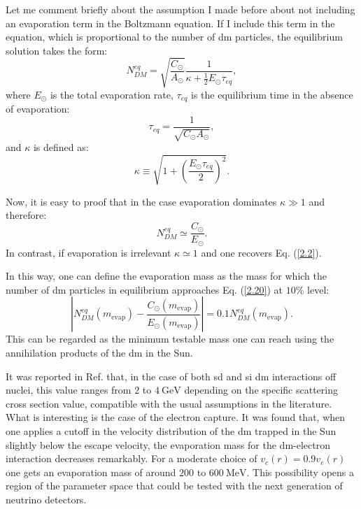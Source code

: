 Let me comment briefly about the assumption I made before about not including an evaporation term in the Boltzmann equation. If I include this term in the equation, which is proportional to the number of \gls{dm} particles, the equilibrium solution takes the form:
\begin{equation}\label{2.17}
	N_{DM}^{eq} = \sqrt{\frac{C_{\odot}}{A_{\odot}}} \frac{1}{\kappa + \frac{1}{2} E_{\odot} \tau_{eq}},
\end{equation}
where $E_{\odot}$ is the total evaporation rate, $\tau_{eq}$ is the equilibrium time in the absence of evaporation:
\begin{equation}\label{2.18}
	\tau_{eq} = \frac{1}{\sqrt{C_{\odot} A_{\odot}}},
\end{equation}
and $\kappa$ is defined as:
\begin{equation}\label{2.19}
	\kappa \equiv \sqrt{1+\left(\frac{E_{\odot}\tau_{eq}}{2}\right)^{2}}.
\end{equation}

Now, it is easy to proof that in the case evaporation dominates $\kappa \gg 1$ and therefore:
\begin{equation}\label{2.20}
	N_{DM}^{eq} \simeq \frac{C_{\odot}}{E_{\odot}}.
\end{equation}
In contrast, if evaporation is irrelevant $\kappa \simeq 1$ and one recovers Eq. (\ref{2.2}).

In this way, one can define the evaporation mass as the mass for which the number of \gls{dm} particles in equilibrium approaches Eq. (\ref{2.20}) at $10 \%$ level:
\begin{equation}\label{2.21}
	\left| N_{DM}^{eq}(m_{\mathrm{evap}}) - \frac{C_{\odot}(m_{\mathrm{evap}})}{E_{\odot}(m_{\mathrm{evap}})} \right| = 0.1 N_{DM}^{eq}(m_{\mathrm{evap}}).
\end{equation}
This can be regarded as the minimum testable mass one can reach using the annihilation products of the \gls{dm} in the Sun.

It was reported in Ref. \cite{Palomares2017} that, in the case of both \gls{sd} and \gls{si} \gls{dm} interactions off nuclei, this value ranges from $2$ to $4 \ \mathrm{GeV}$ depending on the specific scattering cross section value, compatible with the usual assumptions in the literature. What is interesting is the case of the electron capture. It was found that, when one applies a cutoff in the velocity distribution of the \gls{dm} trapped in the Sun slightly below the escape velocity, the evaporation mass for the \gls{dm}-electron interaction decreases remarkably. For a moderate choice of $v_{c}(r) = 0.9 v_{e}(r)$ one gets an evaporation mass of around $200$ to $600 \ \mathrm{MeV}$. This possibility opens a region of the parameter space that could be tested with the next generation of neutrino detectors.

